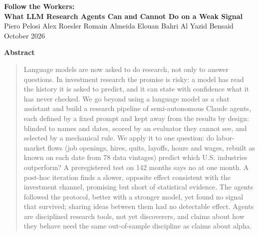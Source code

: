 \documentclass[11pt,letterpaper]{article}
\begin{document}

\begin{titlepage}
\thispagestyle{empty}
\renewcommand{\thefootnote}{\fnsymbol{footnote}}
\vspace*{0.06\textheight}
\begin{center}
{\LARGE\bfseries Follow the Workers:\\[4pt]
What LLM Research Agents Can and Cannot Do on a Weak Signal\footnotemark}\\[18pt]
{\large Piero Pelosi \qquad Alex Roesler \qquad Romain Almeida \qquad
Elouan Bahri \qquad Al Yazid Bensaid}\\[12pt]
{\normalsize October 2026}
\end{center}

\vspace{0.05\textheight}
\begin{center}{\bfseries Abstract}\end{center}
\vspace{-4pt}
\begin{quote}
\small

Language models are now asked to do research, not only to answer questions. In
investment research the promise is risky: a model has read the history it is
asked to predict, and it can state with confidence what it has never checked.
We go beyond using a language model as a chat assistant and build a research
pipeline of semi-autonomous Claude agents, each defined by a fixed prompt and
kept away from the results by design: blinded to names and dates, scored by an
evaluator they cannot see, and selected by a mechanical rule. We apply it to one
question: do labor-market flows (job openings, hires, quits, layoffs, hours and
wages, rebuilt as known on each date from 78 data vintages) predict which U.S.
industries outperform? A preregistered test on 142 months says no at one month.
A post-hoc iteration finds a slower, opposite effect consistent with the
investment channel, promising but short of statistical evidence. The agents
followed the protocol, better with a stronger model, yet found no signal that
survived; sharing ideas between them had no detectable effect. Agents are disciplined
research tools, not yet discoverers, and claims about how they behave need the
same out-of-sample discipline as claims about alpha.
\end{quote}


\end{titlepage}
\end{document}
